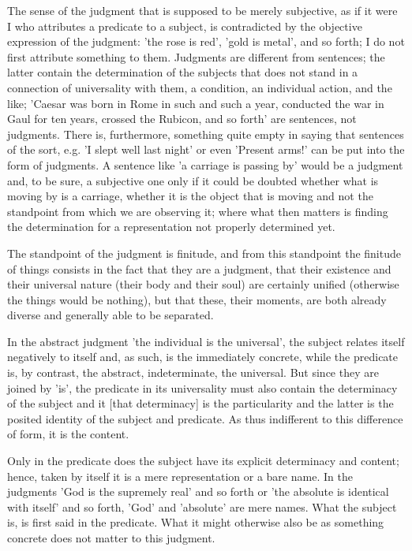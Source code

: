 The sense of the judgment that is supposed to be merely subjective,
as if it were I who attributes a predicate to a subject,
is contradicted by the objective expression of the judgment:
'the rose is red', 'gold is metal', and so forth;
I do not first attribute something to them.
Judgments are different from sentences;
the latter contain the determination of the subjects
that does not stand in a connection of universality with them,
a condition, an individual action, and the like;
'Caesar was born in Rome in such and such a year,
conducted the war in Gaul for ten years, crossed the Rubicon,
and so forth' are sentences, not judgments.
There is, furthermore, something quite empty
in saying that sentences of the sort, e.g.
'I slept well last night' or even 'Present arms!'
can be put into the form of judgments.
A sentence like 'a carriage is passing by' would be a judgment
and, to be sure, a subjective one only if it could be doubted
whether what is moving by is a carriage,
whether it is the object that is moving and not
the standpoint from which we are observing it;
where what then matters is finding the determination
for a representation not properly determined yet.

The standpoint of the judgment is finitude,
and from this standpoint the finitude of things consists
in the fact that they are a judgment,
that their existence and their universal nature
(their body and their soul) are certainly unified
(otherwise the things would be nothing),
but that these, their moments, are
both already diverse and generally able to be separated.

In the abstract judgment 'the individual is the universal',
the subject relates itself negatively to itself
and, as such, is the immediately concrete,
while the predicate is, by contrast,
the abstract, indeterminate, the universal.
But since they are joined by 'is',
the predicate in its universality
must also contain the determinacy of the subject
and it [that determinacy] is the particularity
and the latter is the posited identity of
the subject and predicate.
As thus indifferent to this difference of form,
it is the content.

Only in the predicate does the subject
have its explicit determinacy and content;
hence, taken by itself it is a mere representation or a bare name.
In the judgments 'God is the supremely real' and so forth
or 'the absolute is identical with itself' and so forth,
'God' and 'absolute' are mere names.
What the subject is, is first said in the predicate.
What it might otherwise also be as something concrete
does not matter to this judgment.

